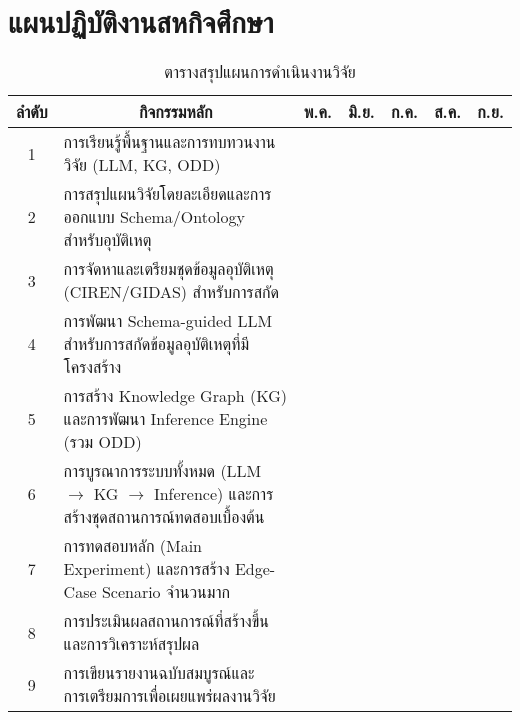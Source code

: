 \section{แผนปฏิบัติงานสหกิจศึกษา}\label{sec:work-plan}

\begin{table}[h!]
    \centering
    \caption{ตารางสรุปแผนการดำเนินงานวิจัย}
    \label{tab:project-timeline-revised}
\begin{tabular}{|c|p{7cm}|c|c|c|c|c|}
\hline
\multicolumn{1}{|c|}{ลำดับ} & \multicolumn{1}{|c|}{กิจกรรมหลัก} & \multicolumn{1}{|c|}{พ.ค.} & \multicolumn{1}{|c|}{มิ.ย.} & \multicolumn{1}{|c|}{ก.ค.} & \multicolumn{1}{|c|}{ส.ค.} & \multicolumn{1}{|c|}{ก.ย.}\\
\hline
1 & การเรียนรู้พื้นฐานและการทบทวนงานวิจัย (LLM, KG, ODD)
  & \cellcolor{gray!40} & \cellcolor{gray!40} &  &  &  \\
\hline
2 & การสรุปแผนวิจัยโดยละเอียดและการออกแบบ Schema/Ontology สำหรับอุบัติเหตุ
  &  & \cellcolor{gray!40} & \cellcolor{gray!40} &  &  \\
\hline
3 & การจัดหาและเตรียมชุดข้อมูลอุบัติเหตุ (CIREN/GIDAS) สำหรับการสกัด
  &  & \cellcolor{gray!40} & \cellcolor{gray!40} &  &  \\
\hline
4 & การพัฒนา Schema-guided LLM สำหรับการสกัดข้อมูลอุบัติเหตุที่มีโครงสร้าง
  &  &  & \cellcolor{gray!40} & \cellcolor{gray!40} &  \\
\hline
5 & การสร้าง Knowledge Graph (KG) และการพัฒนา Inference Engine (รวม ODD)
  &  &  &  & \cellcolor{gray!40} & \cellcolor{gray!40} \\
\hline
6 & การบูรณาการระบบทั้งหมด (LLM $\rightarrow$ KG $\rightarrow$ Inference) และการสร้างชุดสถานการณ์ทดสอบเบื้องต้น
  &  &  &  & \cellcolor{gray!40} & \cellcolor{gray!40} \\
\hline
7 & การทดสอบหลัก (Main Experiment) และการสร้าง Edge-Case Scenario จำนวนมาก
  &  &  &  &  & \cellcolor{gray!40} \\
\hline
8 & การประเมินผลสถานการณ์ที่สร้างขึ้นและการวิเคราะห์สรุปผล
  &  &  &  &  & \cellcolor{gray!40} \\
\hline
9 & การเขียนรายงานฉบับสมบูรณ์และการเตรียมการเพื่อเผยแพร่ผลงานวิจัย
  &  &  &  & \cellcolor{gray!40} & \cellcolor{gray!40} \\
\hline
\end{tabular}
\end{table}